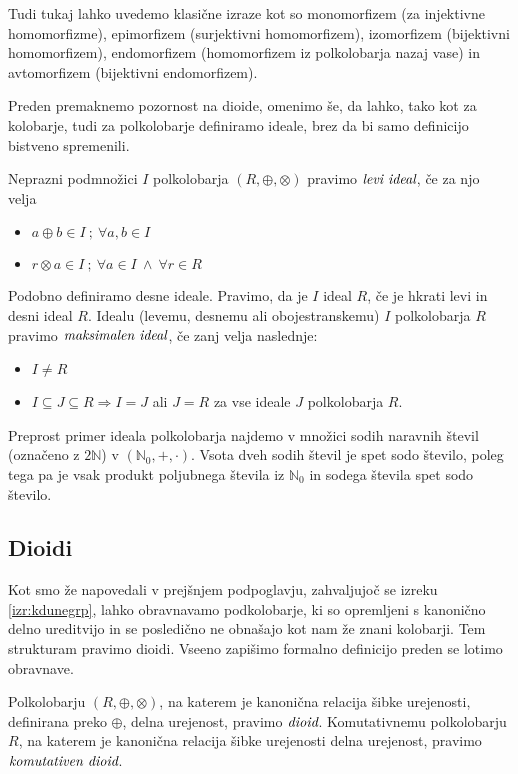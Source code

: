 \documentclass[mat1]{fmfdelo}
\newcommand{\N}{\mathbb{N}}
\newcommand{\No}{\N_0}
\newcommand{\pojem}[1]{\ensuremath{\emph{#1}}}
\begin{document}
Tudi tukaj lahko uvedemo klasične izraze kot so monomorfizem (za injektivne homomorfizme), epimorfizem (surjektivni homomorfizem), izomorfizem (bijektivni homomorfizem), endomorfizem (homomorfizem iz polkolobarja nazaj vase) in avtomorfizem (bijektivni endomorfizem).

Preden premaknemo pozornost na dioide, omenimo še, da lahko, tako kot za kolobarje, tudi za polkolobarje definiramo ideale, brez da bi samo definicijo bistveno spremenili.

\begin{definicija}
	Neprazni podmnožici $I$ polkolobarja $(R, \oplus, \otimes)$ pravimo \pojem{levi ideal}, če za njo velja \begin{itemize}
		\item $a \oplus b \in I~;~\forall a, b\in I$
		\item $r\otimes a \in I~;~\forall a\in I~\land~\forall r\in R$ 
	\end{itemize}
	Podobno definiramo desne ideale. Pravimo, da je $I$ ideal $R$, če je hkrati levi in desni ideal $R$.
	Idealu (levemu, desnemu ali obojestranskemu) $I$ polkolobarja $R$ pravimo \pojem{maksimalen ideal}, če zanj velja naslednje: \begin{itemize}
		\item $I \neq R$
		\item $I \subseteq J \subseteq R \Rightarrow I = J$ ali $J = R$ za vse ideale $J$ polkolobarja $R$.
	\end{itemize}
\end{definicija}
Preprost primer ideala polkolobarja najdemo v množici sodih naravnih števil (označeno z $2\N$) v $(\No, +, \cdot)$. Vsota dveh sodih števil je spet sodo število, poleg tega pa je vsak produkt poljubnega števila iz $\No$ in sodega števila spet sodo število.

\subsection{Dioidi}\label{subsect:dioid}
Kot smo že napovedali v prejšnjem podpoglavju, zahvaljujoč se izreku \ref{izr:kdunegrp}, lahko obravnavamo podkolobarje, ki so opremljeni s kanonično delno ureditvijo in se posledično ne obnašajo kot nam že znani kolobarji. Tem strukturam pravimo dioidi. Vseeno zapišimo formalno definicijo preden se lotimo obravnave.
\begin{definicija}
	Polkolobarju $(R, \oplus, \otimes)$, na katerem je kanonična relacija šibke urejenosti, definirana preko $\oplus$, delna urejenost, pravimo \pojem{dioid}. Komutativnemu polkolobarju $R$, na katerem je kanonična relacija šibke urejenosti delna urejenost, pravimo \pojem{komutativen dioid}.
\end{definicija}
	
\end{document}

